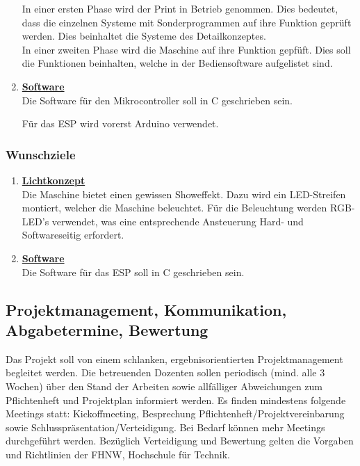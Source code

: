 \begin{enumerate}
In einer ersten Phase wird der Print in Betrieb genommen. Dies bedeutet, dass die einzelnen Systeme mit Sonderprogrammen auf ihre Funktion geprüft werden. Dies beinhaltet die Systeme des Detailkonzeptes.\\

In einer zweiten Phase wird die Maschine auf ihre Funktion gepfüft. Dies soll die Funktionen beinhalten, welche in der Bediensoftware aufgelistet sind.\\
			
			 
\item \underline{\textbf{Software}}\mbox{}\\

Die Software für den Mikrocontroller soll in C geschrieben sein. 
			
Für das ESP wird vorerst Arduino verwendet.
			
\end{enumerate}	
\newpage
\subsubsection{Wunschziele}\label{sec:Wunschziele}

\begin{enumerate}

\item \underline{\textbf{Lichtkonzept}}\mbox{}\\

Die Maschine bietet einen gewissen Showeffekt. Dazu wird ein LED-Streifen montiert, welcher die Maschine beleuchtet. Für die Beleuchtung werden RGB-LED's verwendet, was eine entsprechende Ansteuerung Hard- und Softwareseitig erfordert.\\

\item \underline{\textbf{Software}}\mbox{}\\

Die Software für das ESP soll in C geschrieben sein.
\end{enumerate}

\newpage

\subsection{Projektmanagement, Kommunikation, Abgabetermine, Bewertung}

Das Projekt soll von einem schlanken, ergebnisorientierten Projektmanagement begleitet werden. 
Die betreuenden Dozenten sollen periodisch (mind. alle 3 Wochen) über den Stand der Arbeiten sowie allfälliger Abweichungen zum Pflichtenheft und Projektplan informiert werden.
Es finden mindestens folgende Meetings statt: Kickoffmeeting, Besprechung Pflichtenheft/Projektvereinbarung sowie Schlusspräsentation/Verteidigung. 
Bei Bedarf können mehr Meetings durchgeführt werden.
Bezüglich Verteidigung und Bewertung gelten die Vorgaben und Richtlinien der FHNW, Hochschule für Technik.

